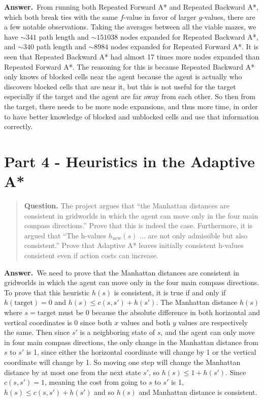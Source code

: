 \documentclass[11pt]{article}
\newcommand{\question}[1]{%
\begin{quote}
\textbf{Question.} #1
\end{quote}
}
\newcommand{\answer}{\textbf{Answer.}\ }
\begin{document}
\answer From running both Repeated Forward A* and Repeated Backward A*, which both break ties with the same \(f\)-value in favor of larger \(g\)-values, there are a few notable observations. Taking the averages between all the viable mazes, we have \(\sim 341\) path length and \(\sim 151038\) nodes expanded for Repeated Backward A*, and \(\sim 340\) path length and \(\sim 8984\) nodes expanded for Repeated Forward A*. It is seen that Repeated Backward A* had almost 17 times more nodes expanded than Repeated Forward A*. The reasoning for this is because Repeated Backward A* only knows of blocked cells near the agent because the agent is actually who discovers blocked cells that are near it, but this is not useful for the target especially if the target and the agent are far away from each other. So then from the target, there needs to be more node expansions, and thus more time, in order to have better knowledge of blocked and unblocked cells and use that information correctly.

\section*{Part 4 - Heuristics in the Adaptive A* }
\question{The project argues that ``the Manhattan distances are consistent in gridworlds in which the agent can move only in the four main compass directions.'' Prove that this is indeed the case. Furthermore, it is argued that ``The h-values \(h_{\text{new}}(s)\) ... are not only admissible but also consistent.'' Prove that Adaptive A* leaves initially consistent h-values consistent even if action costs can increase.}

\answer We need to prove that the Manhattan distances are consistent in gridworlds in which the agent can move only in the four main compass directions. To prove that this heuristic $h(s)$ is consistent, it is true if and only if $h(\text{target}) = 0$ and $h(s) \le c(s, s') + h(s')$. The Manhattan distance $h(s)$ where $s = \text{target}$ must be 0 because the absolute difference in both horizontal and vertical coordinates is 0 since both $x$ values and both $y$ values are respectively the same. Then since $s'$ is a neighboring state of $s$, and the agent can only move in four main compass directions, the only change in the Manhattan distance from $s$ to $s'$ is 1, since either the horizontal coordinate will change by 1 or the vertical coordinate will change by 1. So moving one step will change the Manhattan distance by at most one from the next state $s'$, so $h(s) \le 1 + h(s')$. Since $c(s, s') = 1$, meaning the cost from going to $s$ to $s'$ is 1, $h(s) \le c(s, s') + h(s')$ and so $h(s)$ and Manhattan distance is consistent.
\end{document}
